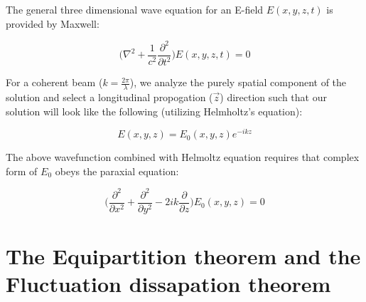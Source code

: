 The general three dimensional wave equation for an E-field $E(x,y,z,t)$ is provided by Maxwell:

$$ \label{eq:waveq}
	\bigg( \nabla ^2 + \frac{1}{c^2} \frac{\partial^2}{\partial t^2} \bigg) E(x,y,z,t) = 0
$$

For a coherent beam ($k = \frac{2 \pi}{\lambda}$), we analyze the purely spatial component of the solution and select a longitudinal propogation ($\vec{z}$) direction such that our solution will look like the following (utilizing Helmholtz's equation):

$$
	E(x,y,z) = E_0(x,y,z) e^{-ikz}
$$

The above wavefunction combined with Helmoltz equation requires that complex form of $E_0$ obeys the paraxial equation:

\begin{equation}\label{eq:paraxial}
	\bigg( \frac{\partial^2}{\partial x ^2} + \frac{\partial^2}{\partial y^2} - 2ik \frac{\partial}{\partial z} \bigg) E_0(x,y,z) = 0
\end{equation}

\section{The Equipartition theorem and the Fluctuation dissapation theorem}

